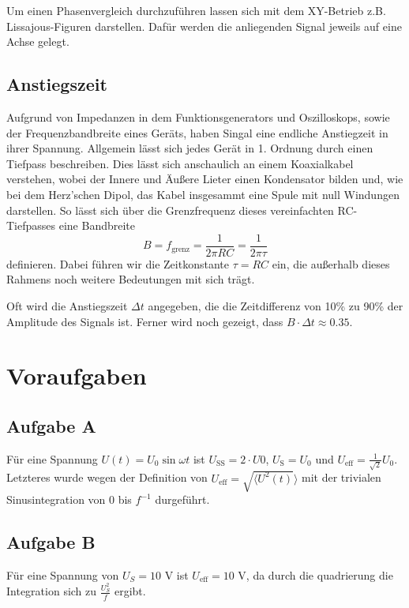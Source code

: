 \documentclass[10pt]{article}
\begin{document}
\begin{multicols}{2}
	Um einen Phasenvergleich durchzuführen lassen sich mit dem XY-Betrieb z.B. Lissajous-Figuren darstellen. Dafür werden die anliegenden Signal jeweils auf eine Achse gelegt.
	\subsection{Anstiegszeit}
	Aufgrund von Impedanzen in dem Funktionsgenerators und Oszilloskops, sowie der Frequenzbandbreite eines Geräts, haben Singal eine endliche Anstiegzeit in ihrer Spannung. Allgemein lässt sich jedes Gerät in 1. Ordnung durch einen Tiefpass beschreiben. Dies lässt sich anschaulich an einem Koaxialkabel verstehen, wobei der Innere und Äußere Lieter einen Kondensator bilden und, wie bei dem Herz'schen Dipol, das Kabel insgesammt eine Spule mit null Windungen darstellen. So lässt sich über die Grenzfrequenz dieses vereinfachten RC-Tiefpasses eine Bandbreite \[B=f_{\text{grenz}}=\frac{1}{2\pi RC}=\frac{1}{2\pi \tau}\] definieren. Dabei führen wir die Zeitkonstante \(\tau=RC\) ein, die außerhalb dieses Rahmens noch weitere Bedeutungen mit sich trägt.

	Oft wird die Anstiegszeit \(\Delta t\) angegeben, die die Zeitdifferenz von 10\% zu 90\% der Amplitude des Signals ist. Ferner wird noch gezeigt, dass \(B\cdot\Delta t \approx 0.35\).
	\section{\large Voraufgaben}

	\subsection{Aufgabe A}
	Für eine Spannung \(U(t)=U_0\sin{\omega t}\) ist \(U_{\text{SS}}=2 \cdot U0\), \(U_{\text{S}}=U_0\) und \(U_{\text{eff}}=\frac{1}{\sqrt{2}}U_0\). Letzteres wurde wegen der Definition von \(U_{\text{eff}}=\sqrt{\langle U^2(t)}\rangle\) mit der trivialen Sinusintegration von 0 bis \(f^{-1}\) durgeführt.

	\subsection{Aufgabe B}
	Für eine Spannung von \(U_S=10\) V ist \(U_{\text{eff}} = 10\) V, da durch die quadrierung die Integration sich zu \(\frac{U_S^2}{f}\) ergibt.

\end{multicols}
\end{document}
